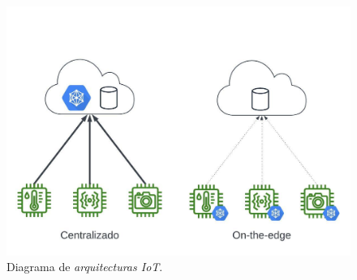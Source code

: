 \documentclass[
11pt, %
codirector, %
]{charter}
\begin{document}
\begin{figure}[htpb]
\centering 
\includegraphics[height=.4\textheight]{./Figuras/EdgeVsCentralizedAI2.png}
\caption{Diagrama de \textit{arquitecturas IoT}.}
\label{fig:EdgeVsCent}
\end{figure}
\end{document}
